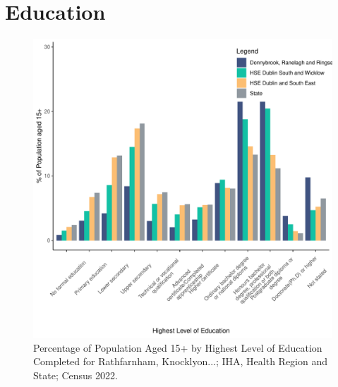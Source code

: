 \documentclass{article}
\begin{document}
\section{Education}\label{sect:Edu}
\begin{figure}[H]
	\centering
	\includegraphics[width = 120mm]{../figures/EduED.pdf}
	\caption{Percentage of Population Aged 15+ by Highest Level of Education Completed for Rathfarnham, Knocklyon...; IHA, Health Region and State; Census 2022.}
	\label{fig:vbnv}
	\end{figure}
\end{document}
